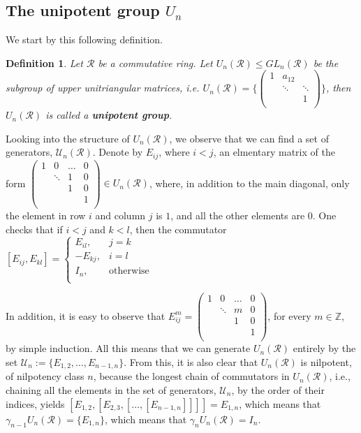 \documentclass[12pt]{article}
\newtheorem{definition}[theorem]{Definition}
\begin{document}
\subsection{The unipotent group $U_n$}
We start by this following definition.
\begin{definition}
\label{def.unipotent.matrix}
Let $\mathcal{R}$ be a commutative ring. Let $U_n(\mathcal{R})\leq GL_n(\mathcal{R})$ be the subgroup of upper unitriangular matrices, i.e. $U_n(\mathcal{R})=\Bigg\{
\begin{pmatrix}
1 & a_{12} &\\
  & \ddots & \ddots\\
  & & 1\\
\end{pmatrix}\Bigg\}$, then $U_n(\mathcal{R})$ is called a \textbf{unipotent group}.
\end{definition}
Looking into the structure of $U_n(\mathcal{R})$, we observe that we can find a set of generators, $\mathcal{U}_n(\mathcal{R})$. Denote by $E_{ij}$, where $i<j$, an elmentary matrix of the form $\begin{pmatrix}
1 & 0 & \dots & 0\\
  & \ddots & 1 & 0\\
  &  & 1 & 0\\
  & & & 1\\
  \end{pmatrix}\in U_n(\mathcal{R})$, where, in addition to the main diagonal, only the element in row $i$ and column $j$ is $1$, and all the other elements are $0$. One checks that if $i<j$ and $k<l$, then the commutator $[E_{ij},E_{kl}]=\begin{cases}
    E_{il}, & j=k\\
    -E_{kj}, & {i=l}\\
    I_n, & \text{otherwise}\\
    \end{cases}$\par
  In addition, it is easy to observe that $E_{ij}^m=\begin{pmatrix}
1 & 0 & \dots & 0\\
  & \ddots & m & 0\\
  &  & 1 & 0\\
  & & & 1\\
  \end{pmatrix}$, for every $m\in\mathbb{Z}$, by simple induction.
All this means that we can generate $U_n(\mathcal{R})$ entirely by the set $\mathcal{U}_n:=\{E_{1,2},\dots,E_{n-1,n}\}$. From this, it is also clear that $U_n(\mathcal{R})$ is nilpotent, of nilpotency class $n$, because the longest chain of commutators in $U_n(\mathcal{R})$, i.e., chaining all the elements in the set of generators, $\mathcal{U}_n$, by the order of their indices, yields $[E_{1,2},[E_{2,3},[\dots,[E_{n-1,n}]]]]=E_{1,n}$, which means that $\gamma_{n-1}U_n(\mathcal{R})=\{E_{1,n}\}$, which means that $\gamma_n U_n(\mathcal{R})=I_n$.\par
\end{document}
